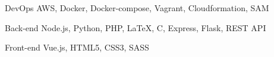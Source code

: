 

\begin{cvskills}

  \cvskill
    {DevOps} %
    {AWS, Docker, Docker-compose, Vagrant, Cloudformation, SAM} %

  \cvskill
    {Back-end} %
    {Node.js, Python, PHP, LaTeX, C, Express, Flask, REST API} %

  \cvskill
    {Front-end} %
    {Vue.js, HTML5, CSS3, SASS} %


\end{cvskills}
